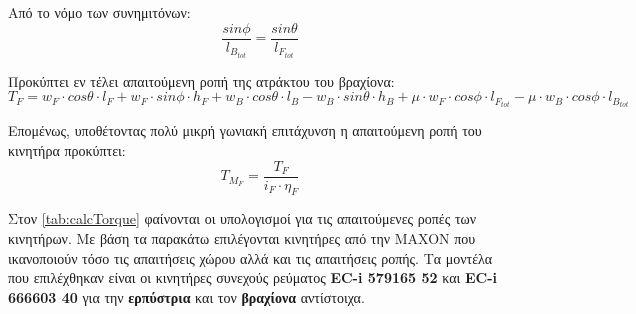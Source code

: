 Από το νόμο των συνημιτόνων:
\begin{equation}
\frac{sin\phi}{l_{B_{tot}}} = \frac{sin\theta}{l_{F_{tot}}}
\end{equation}

Προκύπτει εν τέλει απαιτούμενη ροπή της ατράκτου του βραχίονα:
\begin{equation}
T_{F} = w_F \cdot cos\theta \cdot l_F + w_F \cdot sin \phi \cdot h_F + w_B \cdot cos\theta\cdot l_B -w_B \cdot sin\theta \cdot h_B + \mu \cdot w_F \cdot cos\phi \cdot l_{F_{tot}} - \mu\cdot w_B \cdot cos\phi \cdot  l_{B_{tot}}
\end{equation}

Επομένως, υποθέτοντας πολύ μικρή γωνιακή επιτάχυνση η απαιτούμενη ροπή του κινητήρα προκύπτει:
\begin{equation}
T_{M_{F}} = \frac{T_{F}}{i_F\cdot \eta_F}
\end{equation}


Στον \ref{tab:calcTorque} φαίνονται οι υπολογισμοί για τις απαιτούμενες ροπές των κινητήρων. Με βάση τα παρακάτω επιλέγονται κινητήρες από την MAXON που ικανοποιούν τόσο τις απαιτήσεις χώρου αλλά και τις απαιτήσεις ροπής. Τα μοντέλα που επιλέχθηκαν είναι οι κινητήρες συνεχούς ρεύματος \textbf{EC-i 579165 52} και \textbf{EC-i 666603 40} για την \textbf{ερπύστρια} και τον \textbf{βραχίονα} αντίστοιχα.

